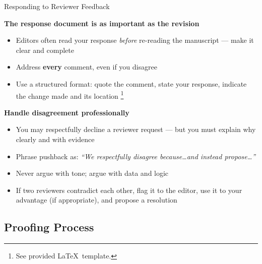 \documentclass{beamer}
\begin{document}
\begin{frame}{Responding to Reviewer Feedback}

  \footnotesize
  \textbf{The response document is as important as the revision}
  \begin{itemize}
    \item Editors often read your response \emph{before} re-reading
      the manuscript --- make it clear and complete
    \item Address \textbf{every} comment, even if you disagree
    \item Use a structured format: quote the comment, state your
      response, indicate the change made and its location%
      \footnote{\scriptsize See provided \LaTeX\ template.}
  \end{itemize}

  \medskip
  \textbf{Handle disagreement professionally}
  \begin{itemize}
    \item You may respectfully decline a reviewer request ---
      but you must explain why clearly and with evidence
    \item Phrase pushback as: \emph{``We respectfully disagree
      because\ldots and instead propose\ldots''}
    \item Never argue with tone; argue with data and logic
    \item If two reviewers contradict each other, flag it to
      the editor, use it to your advantage (if appropriate), and propose a resolution
  \end{itemize}

\end{frame}




\subsection{Proofing Process}
\end{document}
